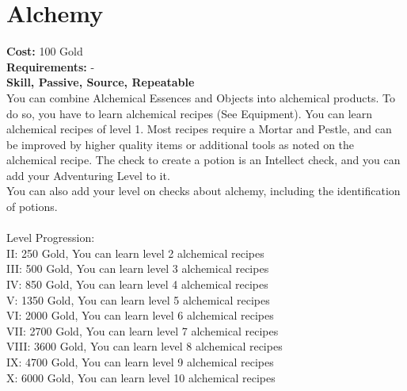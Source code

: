 \section*{Alchemy}
\textbf{Cost:} 100 Gold\\
\textbf{Requirements:} -\\
\textbf{Skill, Passive, Source, Repeatable}\\
You can combine Alchemical Essences and Objects into alchemical products. To do so, you have to learn alchemical recipes (See Equipment). You can learn alchemical recipes of level 1. Most recipes require a Mortar and Pestle, and can be improved by higher quality items or additional tools as noted on the alchemical recipe. The check to create a potion is an Intellect check, and you can add your Adventuring Level to it.\\
You can also add your level on checks about alchemy, including the identification of potions.\\
\\
Level Progression:\\
II: 250 Gold, You can learn level 2 alchemical recipes\\
III: 500 Gold, You can learn level 3 alchemical recipes\\
IV: 850 Gold, You can learn level 4 alchemical recipes\\
V: 1350 Gold, You can learn level 5 alchemical recipes\\
VI: 2000 Gold, You can learn level 6 alchemical recipes\\
VII: 2700 Gold, You can learn level 7 alchemical recipes\\
VIII: 3600 Gold, You can learn level 8 alchemical recipes\\
IX: 4700 Gold, You can learn level 9 alchemical recipes\\
X: 6000 Gold, You can learn level 10 alchemical recipes\\